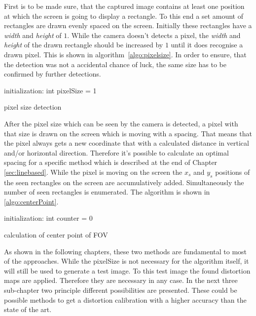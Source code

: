 \documentclass[journal,final,a4paper,twoside]{PS}
\begin{document}
First is to be made sure, that the captured image contains at least one position at which the screen is going to display a rectangle. To this end a set amount of rectangles are drawn evenly spaced on the screen. Initially these rectangles have a \emph{width} and \emph{height} of $1$. While the camera doesn't detects a pixel, the \emph{width} and \emph{height} of the drawn rectangle should be increased by $1$ until it does recognise a drawn pixel. This is shown in algorithm~\ref{algo:pixelsize}. In order to ensure, that the detection was not a accidental chance of luck, the same size has to be confirmed by further detections. \\
\begin{algorithm}[h]
 initialization: int pixelSize = 1\;
 \caption{pixel size detection}
 \label{algo:pixelsize}
\end{algorithm} 
After the pixel size which can be seen by the camera is detected, a pixel with that size is drawn on the screen which is moving with a spacing. That means that the pixel always gets a new coordinate that with a calculated distance in vertical and/or horizontal  direction. Therefore it's possible to calculate an optimal spacing for a specific method which is described at the end of Chapter \ref{sec:linebased}. While the pixel is moving on the screen the $x_s$ and $y_s$ positions of the seen rectangles on the screen are accumulatively added. Simultaneously the number of seen rectangles is enumerated. The algorithm is shown in \ref{algo:centerPoint}.
 
\begin{algorithm}[h]
 initialization: int counter = 0\;
 \caption{calculation of center point of FOV}
 \label{algo:centerPoint}
\end{algorithm} 

As shown in the following chapters, these two methods are fundamental to most of the approaches. While the pixelSize is not necessary for the algorithm itself, it will still be used to generate a test image. To this test image the found distortion maps are applied. Therefore they are necessary in any case. In the next three sub-chapter two principle different possibilities are presented. These could be possible methods to get a distortion calibration with a higher accuracy than the state of the art. 
\end{document}
